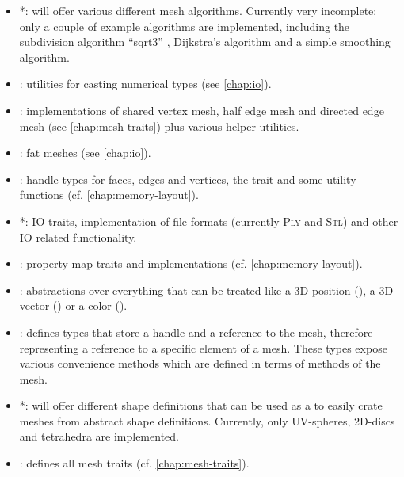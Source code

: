 \begin{itemize}
  \item \textbf{}*: will offer various different mesh algorithms.
  Currently very incomplete: only a couple of example algorithms are implemented, including the subdivision algorithm \enquote{sqrt3} \cite{kobbelt20003}, Dijkstra's algorithm \cite{dijkstra1959note} and a simple smoothing algorithm.
  \item \textbf{}: utilities for casting numerical types (see \autoref{chap:io}).
  \item \textbf{}: implementations of shared vertex mesh, half edge mesh and directed edge mesh (see \autoref{chap:mesh-traits}) plus various helper utilities.
  \item \textbf{}: fat meshes (see \autoref{chap:io}).
  \item \textbf{}: handle types for faces, edges and vertices, the  trait and some utility functions (cf. \autoref{chap:memory-layout}).
  \item \textbf{}*: IO traits, implementation of file formats (currently \textsc{Ply} and \textsc{Stl}) and other IO related functionality.
  \item \textbf{}: property map traits and implementations (cf. \autoref{chap:memory-layout}).
  \item \textbf{}: abstractions over everything that can be treated like a 3D position (), a 3D vector () or a color ().
  \item \textbf{}: defines types that store a handle and a reference to the mesh, therefore representing a reference to a specific element of a mesh.
  These types expose various convenience methods which are defined in terms of methods of the mesh.
  \item \textbf{}*: will offer different shape definitions that can be used as a  to easily crate meshes from abstract shape definitions.
  Currently, only UV-spheres, 2D-discs and tetrahedra are implemented.
  \item \textbf{}: defines all mesh traits (cf. \autoref{chap:mesh-traits}).
\end{itemize}
